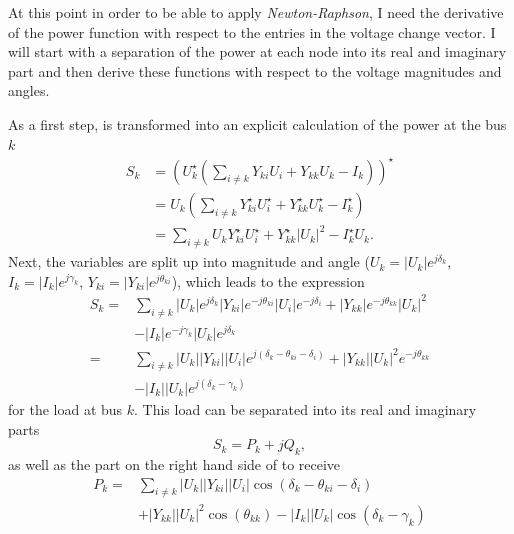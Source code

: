 At this point in order to be able to apply \emph{Newton-Raphson}, I need the derivative of the power function with respect to the entries in the voltage change vector. I will start with a separation of the power at each node into its real and imaginary part and then derive these functions with respect to the voltage magnitudes and angles.

As a first step,  is transformed into an explicit calculation of the power at the bus $k$
\begin{align}
	S_k &= \left( U_k^\star \left( \sum_{i \ne k} Y_{ki} U_i + Y_{kk} U_k - I_k \right) \right)^\star \\
		&= U_k \left( \sum_{i \ne k} Y_{ki}^\star U_i^\star + Y_{kk}^\star U_k^\star - I_k^\star \right) \\
		&= \sum_{i \ne k} U_k Y_{ki}^\star U_i^\star + Y_{kk}^\star |U_k|^2 - I_k^\star U_k.
	\label{eq:complex_power}
\end{align}
Next, the variables are split up into magnitude and angle ($U_k = |U_k| e^{j \delta_k}$, $I_k = |I_k| e^{j \gamma_k}$, $Y_{ki} = |Y_{ki}| e^{j \theta_{ki}}$), which leads to the expression
\begin{equation}
	\begin{split}
		S_k = 	& \sum_{i \ne k} |U_k| e^{j \delta_k} |Y_{ki}| e^{-j \theta_{ki}} |U_i| e^{-j \delta_i} + |Y_{kk}| e^{-j \theta_{kk}} |U_k|^2 \\
				& - |I_k| e^{-j \gamma_k} |U_k| e^{j \delta_k} \\
			= 	& \sum_{i \ne k} |U_k| |Y_{ki}| |U_i| e^{j \left( \delta_k - \theta_{ki} - \delta_i \right)} + |Y_{kk}| |U_k|^2 e^{-j \theta_{kk}} \\
				& - |I_k| |U_k| e^{j \left( \delta_k - \gamma_k \right)}
	\end{split}
	\label{eq:newton_raphson_polar}
\end{equation}
for the load at bus $k$. This load can be separated into its real and imaginary parts
\begin{equation}
	S_k = P_k + j Q_k,
\end{equation}
as well as the part on the right hand side of  to receive
\begin{equation}
	\begin{split}
		P_k = 	& \sum_{i \ne k} |U_k| |Y_{ki}| |U_i| \cos \left( \delta_k - \theta_{ki} - \delta_i \right) \\
				& + |Y_{kk}| |U_k|^2 \cos \left( \theta_{kk} \right) - |I_k| |U_k| \cos \left( \delta_k - \gamma_k \right)
	\end{split}
\end{equation}
